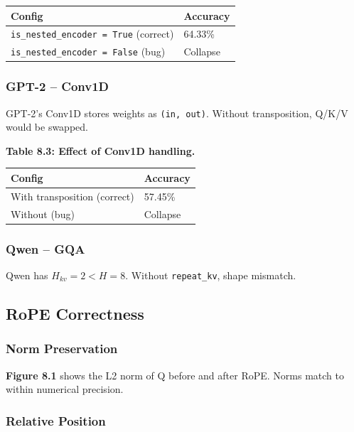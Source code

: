 {\begin{table}[H]
\centering
\small
\begin{tabular}{ll}
\toprule
\textbf{Config} & \textbf{Accuracy} \\
\midrule
\texttt{is\_nested\_encoder = True} (correct) & 64.33\% \\
\texttt{is\_nested\_encoder = False} (bug) & Collapse \\
\bottomrule
\end{tabular}
\end{table}

\subsubsection{GPT-2 -- Conv1D}

GPT-2's Conv1D stores weights as \texttt{(in, out)}. Without transposition, 
Q/K/V would be swapped.

\textbf{Table 8.3: Effect of Conv1D handling.}

\begin{table}[H]
\centering
\small
\begin{tabular}{ll}
\toprule
\textbf{Config} & \textbf{Accuracy} \\
\midrule
With transposition (correct) & 57.45\% \\
Without (bug) & Collapse \\
\bottomrule
\end{tabular}
\end{table}

\subsubsection{Qwen -- GQA}

Qwen has $H_{kv} = 2 < H = 8$. Without \texttt{repeat\_kv}, shape mismatch.

\subsection{RoPE Correctness}

\subsubsection{Norm Preservation}

\textbf{Figure 8.1} shows the L2 norm of Q before and after RoPE. Norms 
match to within numerical precision.

\subsubsection{Relative Position}

}
